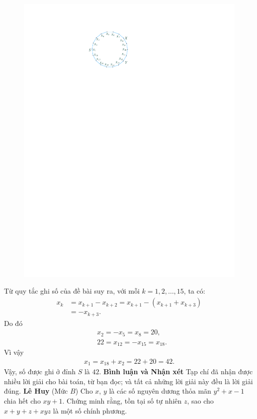 \begin{multicols}{2}
\begin{figure}[H]
		\captionsetup{labelformat= empty, justification=centering}
		\includegraphics[width=0.75\linewidth]{P641}
		\vspace*{-10pt}
	\end{figure}
	Từ quy tắc ghi số của đề bài suy ra, với mỗi $k = 1, 2, \ldots, 15$, ta có:
	\begin{align*}
		{x_k} &= {x_{k + 1}} - {x_{k + 2}} = {x_{k + 1}} - \left( {{x_{k + 1}} + {x_{k + 3}}} \right) \\
		&=  - {x_{k + 3}}.
	\end{align*}
	Do đó
		\begin{align*}
			&{x_2} =  - {x_5} = {x_8} = 20,\\
			&22 = {x_{12}} =  - {x_{15}} = {x_{18}}.
		\end{align*}
	Vì vậy
	\begin{align*}
		{x_1} = {x_{18}} + {x_2} = 22 + 20 = 42.
	\end{align*}
	Vậy, số được ghi ở đỉnh $S$ là $42$.
	\vskip 0.05cm
	\textbf{\color{thachthuctoanhoc}Bình luận và Nhận xét}
	\vskip 0.05cm	
	Tạp chí đã nhận được nhiều lời giải cho bài toán, từ bạn đọc; và tất cả những lời giải này đều là lời giải đúng.
	\vskip 0.1cm
	\hfill	\textbf{\color{thachthuctoanhoc}Lê Huy}
	\vskip 0.1cm
	{}
	(Mức $B$)
	Cho $x$, $y$ là các số nguyên dương thỏa mãn $y^2 \!+\! x \!-\! 1$ chia hết cho $xy \!+\! 1$. Chứng minh rằng, tồn tại số tự nhiên $z$, sao cho $x + y + z + xyz$ là một số chính phương.

\end{multicols}
